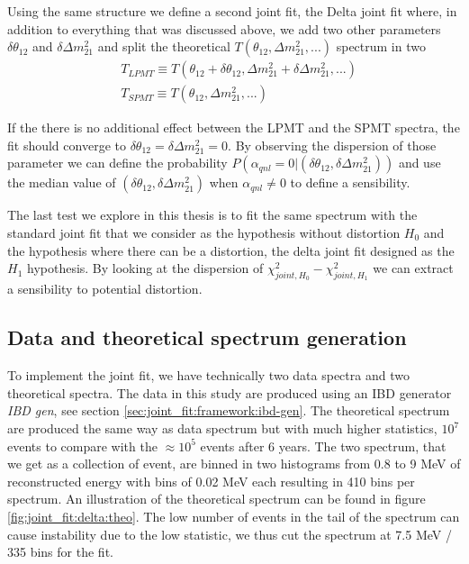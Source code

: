 \documentclass[../main.tex]{subfiles}
\begin{document}
Using the same structure we define a second joint fit, the Delta joint fit where, in addition to everything that was discussed above, we add two other parameters $\delta \theta_{12}$ and $\delta \Delta m^2_{21}$ and split the theoretical $T(\theta_{12}, \Delta m^2_{21}, ...)$ spectrum in two
\begin{equation}
\begin{split}
           &T_{LPMT} \equiv T(\theta_{12} + \delta \theta_{12}, \Delta m^2_{21} + \delta \Delta m^2_{21}, ...) \\
           &T_{SPMT} \equiv T(\theta_{12}                     , \Delta m^2_{21}                         , ...)
\end{split}
\end{equation}

If the there is no additional effect between the LPMT and the SPMT spectra, the fit should converge to $\delta \theta_{12} = \delta \Delta m^2_{21} = 0$. By observing the dispersion of those parameter we can define the probability $P(\alpha_{qnl} = 0 | (\delta \theta_{12}, \delta \Delta m^2_{21}))$ and use the median value of $(\delta \theta_{12}, \delta \Delta m^2_{21})$ when $\alpha_{qnl} \neq 0$ to define a sensibility.

The last test we explore in this thesis is to fit the same spectrum with the standard joint fit that we consider as the hypothesis without distortion $H_0$ and the hypothesis where there can be a distortion, the delta joint fit designed as the $H_1$ hypothesis. By looking at the dispersion of $\chi^2_{joint,H_0} - \chi^2_{joint,H_1}$ we can extract a sensibility to potential distortion.

\subsection{Data and theoretical spectrum generation}
\label{sec:joint_fit:data_gen}

To implement the joint fit, we have technically two data spectra and two theoretical spectra. The data in this study are produced using an IBD generator \textit{IBD gen}, see section \ref{sec:joint_fit:framework:ibd-gen}. The theoretical spectrum are produced the same way as data spectrum but with much higher statistics, $10^7$ events to compare with the $\approx 10^5$ events after 6 years. The two spectrum, that we get as a collection of event, are binned in two histograms from 0.8 to 9 MeV of reconstructed energy with bins of 0.02 MeV each resulting in 410 bins per spectrum. An illustration of the theoretical spectrum can be found in figure \ref{fig:joint_fit:delta:theo}. The low number of events in the tail of the spectrum can cause instability due to the low statistic, we thus cut the spectrum at 7.5 MeV / 335 bins for the fit.
\end{document}
